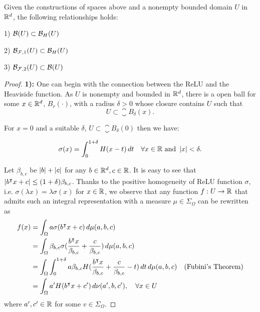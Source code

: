 \begin{proposition}
    Given the constructions of spaces above and a nonempty bounded domain $U$ in
    $\mathbb{R}^d$, the following relationships holds:

    1) $\mathcal{B}(U) \subset \mathcal{B}_{H}(U)$

    2) $\mathcal{B}_{\mathcal{F}, 1}(U) \subset \mathcal{B}_{H}(U)$

    3) $\mathcal{B}_{\mathcal{F}, 2}(U) \subset \mathcal{B}(U)$
\end{proposition}


\begin{proof}


\textbf{1):} 
One can begin with the connection between the ReLU and the Heaviside function.
As $U$ is nonempty and bounded in $\mathbb{R}^d$, there is a open ball for some $x \in
\mathbb{R}^d$, $B_r(\cdot)$, with a radius $\delta > 0$ whose closure contains $U$ such
that
\begin{equation}
    U \subset \closure{B_{\delta}(x)}.
\end{equation}

For $x=0$ and a suitable $\delta$, $U \subset \closure{B_{\delta}(0)}$ then we
have:

\begin{equation}
    \sigma(x) = \int_0^{1+\delta} H(x-t) \,dt 
    \quad \forall x \in \mathbb{R} \textnormal{ and } \left| x \right| < \delta.
\end{equation}

Let $\beta_{b,c}$ be $\left| b \right| + \left| c \right|$ for any $b\in\mathbb{R}^d, c\in\mathbb{R}$. It is easy
to see that $\left| b{}^{\intercal} x + c \right| \leq (1+\delta)\beta_{b,c}$. Thanks to the
positive homogeneity of ReLU function $\sigma$, i.e. $\sigma(\lambda x) =
\lambda \sigma(x)$ for $x \in \mathbb{R}$, we observe that any function $f:U\to\mathbb{R}$ that
admits such an integral representation with a measure $\mu \in \Sigma_{\Omega}$
can be rewritten as
\begin{align*}
    f(x) 
    &= \int_{\Omega} a \sigma(b{}^{\intercal} x + c )\,d\mu(a,b,c) \\
    &= \int_{\Omega} \beta_{b,c} \sigma(
        \frac{b{}^{\intercal} x}{\beta_{b,c}}+ \frac{c}{\beta_{b,c}}
    ) \,d\mu(a,b,c) \\
    &= \int_{\Omega} \int_0^{1+\delta} 
        a\beta_{b,c} H(\frac{b{}^{\intercal} x}{\beta_{b,c}} +
        \frac{c}{\beta_{b,c}} -t)\,dt\,d\mu(a,b,c) \quad
        \text{(Fubini's Theorem)} \\
    &= \int_{\Omega} a' H(b{}^{\intercal} x + c') \,d\nu(a',b,c'), 
    \quad \forall x \in U
\end{align*}
where $a', c' \in \mathbb{R}$ for some $v \in \Sigma_{\Omega}$.


\end{proof}
